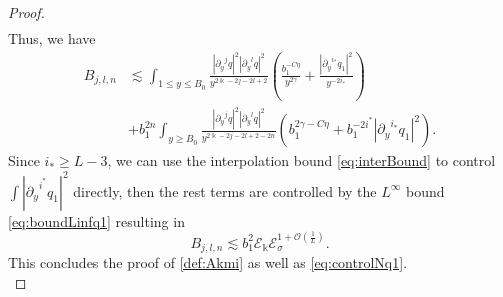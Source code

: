 \documentclass[11pt]{aims}
\theoremstyle{definition}
\numberwithin{equation}{section}
\begin{document}
\begin{proof}
\begin{align*}
\end{align*}
Thus, we have 
\begin{align*}
B_{j,l,n} &\lesssim \int_{1 \leq y \leq B_0}\frac{|{\partial_y}^j q|^2 |{\partial_y}^l q|^2}{y^{2\Bbbk - 2j - 2l + 2}}\left(\frac{b_1^{-C\eta}}{y^{2\gamma}} + \frac{|{\partial_y}^{i_*} q_1|^2}{y^{- 2i_*}}\right)\\
& +b_1^{2n}\int_{y \geq B_0}\frac{|{\partial_y}^j q|^2 |{\partial_y}^l q|^2}{y^{2\Bbbk - 2j - 2l + 2 - 2n}} \left(b_1^{2\gamma - C\eta} +  b_1^{- 2i^* } |{\partial_y}^{i_*}q_1|^2  \right).
\end{align*}
Since $i_* \geq L - 3$, we can use the interpolation bound \eqref{eq:interBound} to control $\int |{\partial_y}^{i^*}q_1|^2$ directly, then the rest terms are controlled by the $L^\infty$ bound \eqref{eq:boundLinfq1} resulting in 
$$B_{j,l,n} \lesssim b_1^2 {\mathscr{E}}_\Bbbk{\mathscr{E}}_\sigma^{1 + {\mathcal{O}}\left(\frac{1}{L} \right)}.$$
This concludes the proof of \eqref{def:Akmi} as well as \eqref{eq:controlNq1}. \\


\end{proof}
\end{document}
